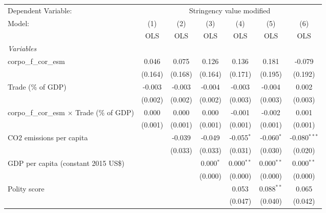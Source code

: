 
\begingroup
\centering
\begin{tabular}{lcccccc}
   \toprule
   Dependent Variable: & \multicolumn{6}{c}{Stringency value modified}\\
   Model:                                             & (1)     & (2)     & (3)         & (4)          & (5)          & (6)\\  
                                                      &  OLS    & OLS     & OLS         & OLS          & OLS          & OLS\\  
   \midrule
   \emph{Variables}\\
   corpo\_f\_cor\_esm                                 & 0.046   & 0.075   & 0.126       & 0.136        & 0.181        & -0.079\\   
                                                      & (0.164) & (0.168) & (0.164)     & (0.171)      & (0.195)      & (0.192)\\   
   Trade (\% of GDP)                                  & -0.003  & -0.003  & -0.004      & -0.003       & -0.004       & 0.002\\   
                                                      & (0.002) & (0.002) & (0.002)     & (0.003)      & (0.003)      & (0.003)\\   
   corpo\_f\_cor\_esm $\times$ Trade (\% of GDP)      & 0.000   & 0.000   & 0.000       & -0.001       & -0.002       & 0.001\\   
                                                      & (0.001) & (0.001) & (0.001)     & (0.001)      & (0.001)      & (0.001)\\   
   CO2 emissions per capita                           &         & -0.039  & -0.049      & -0.055$^{*}$ & -0.060$^{*}$ & -0.080$^{***}$\\   
                                                      &         & (0.033) & (0.033)     & (0.031)      & (0.030)      & (0.020)\\   
   GDP per capita (constant 2015 US\$)                &         &         & 0.000$^{*}$ & 0.000$^{**}$ & 0.000$^{**}$ & 0.000$^{**}$\\   
                                                      &         &         & (0.000)     & (0.000)      & (0.000)      & (0.000)\\   
   Polity score                                       &         &         &             & 0.053        & 0.088$^{**}$ & 0.065\\   
                                                      &         &         &             & (0.047)      & (0.040)      & (0.042)\\   

\end{tabular}
